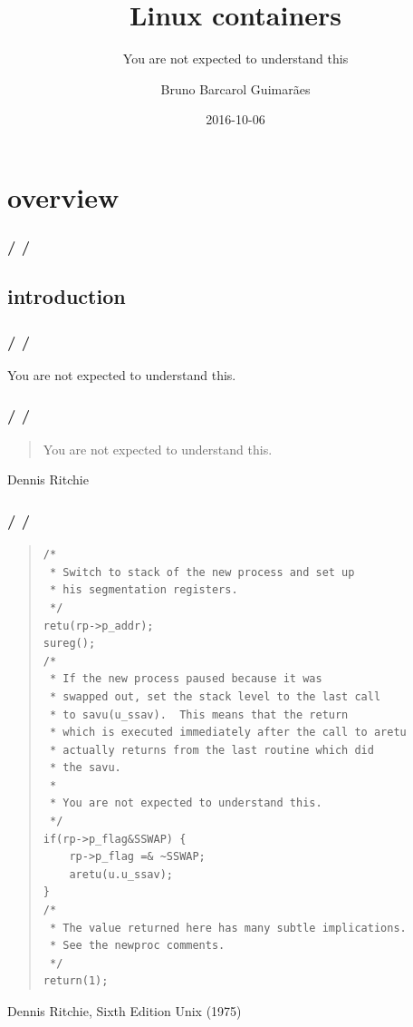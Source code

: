 \documentclass{beamer}
\title{Linux containers}
\subtitle{You are not expected to understand this}
\author{Bruno Barcarol Guimarães}
\institute[]{\textit{bbguimaraes.com}}
\date{2016-10-06}
\newcommand{\autotitle}
{\frametitle{
    \secname
    \ifx\insertsubsection\empty
    \else
        /\subsecname
        \ifx\insertsubsubsection\empty\else/\subsubsecname\fi
    \fi}}
\begin{document}
\begin{frame}
    \titlepage
\end{frame}

\section{overview}

\begin{frame}
    \autotitle
    \tableofcontents
\end{frame}

\subsection{introduction}

\begin{frame}
    \autotitle
    You are not expected to understand this.
\end{frame}

\begin{frame}
    \autotitle
    \begin{quote}
        You are not expected to understand this.
    \end{quote}
    Dennis Ritchie
\end{frame}

\begin{frame}[fragile]
    \autotitle
    \begin{quote}
        \tiny
        \begin{verbatim}
/*
 * Switch to stack of the new process and set up
 * his segmentation registers.
 */
retu(rp->p_addr);
sureg();
/*
 * If the new process paused because it was
 * swapped out, set the stack level to the last call
 * to savu(u_ssav).  This means that the return
 * which is executed immediately after the call to aretu
 * actually returns from the last routine which did
 * the savu.
 *
 * You are not expected to understand this.
 */
if(rp->p_flag&SSWAP) {
    rp->p_flag =& ~SSWAP;
    aretu(u.u_ssav);
}
/*
 * The value returned here has many subtle implications.
 * See the newproc comments.
 */
return(1);
        \end{verbatim}
    \end{quote}
    Dennis Ritchie, Sixth Edition Unix (1975)
    \cite{dennis_you_are_not_expected}
\end{frame}
\end{document}
